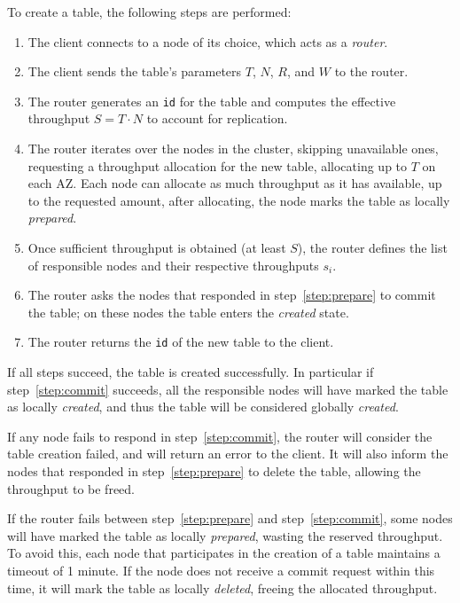 To create a table, the following steps are performed:
\begin{enumerate}
    \item The client connects to a node of its choice, which acts as a
        \emph{router}.
    \item The client sends the table's parameters $T$, $N$,
        $R$, and $W$ to the router.
    \item The router generates an \texttt{id} for the table and computes the
        effective throughput $S = T \cdot N$ to account for replication.
    \item\label{step:prepare} The router iterates over the nodes in the
        cluster, skipping unavailable ones, requesting a throughput allocation
        for the new table, allocating up to $T$ on each AZ\@.
        Each node can allocate as much throughput as it has available, up to the
        requested amount, after allocating, the node marks the
        table as locally \emph{prepared}.
    \item Once sufficient throughput is obtained (at least $S$), the router
        defines the list of responsible nodes and their respective throughputs
        $s_i$.
    \item\label{step:commit} The router asks the nodes that responded in
        step~\ref{step:prepare} to commit the table; on these nodes the table
        enters the \emph{created} state.
    \item The router returns the \texttt{id} of the new table to the client.
\end{enumerate}

If all steps succeed, the table is created successfully.
In particular if step~\ref{step:commit} succeeds, all the responsible nodes
will have marked the table as locally \emph{created}, and thus the table will
be considered globally \emph{created}.

If any node fails to respond in step~\ref{step:commit}, the router will
consider the table creation failed, and will return an error to the client.
It will also inform the nodes that responded in step~\ref{step:prepare} to
delete the table, allowing the throughput to be freed.

If the router fails between step~\ref{step:prepare} and step~\ref{step:commit},
some nodes will have marked the table as locally \emph{prepared}, wasting the
reserved throughput.
To avoid this, each node that participates in the creation of a table maintains
a timeout of 1 minute.
If the node does not receive a commit request within this time, it will mark
the table as locally \emph{deleted}, freeing the allocated throughput.

